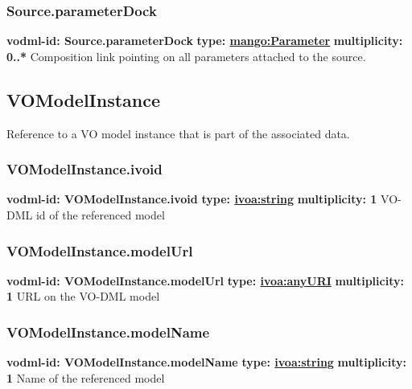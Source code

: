     \subsubsection{Source.parameterDock}
      \textbf{vodml-id: Source.parameterDock} \newline
      \textbf{type: \hyperref[sect:Parameter]{mango:Parameter}} \newline
      \textbf{multiplicity: 0..*} \newline 
      Composition link pointing on all parameters attached to the source.

  \subsection{VOModelInstance}
  \label{sect:VOModelInstance}
    Reference to a VO model instance that is part of the associated data.

    \subsubsection{VOModelInstance.ivoid}
      \textbf{vodml-id: VOModelInstance.ivoid} \newline
      \textbf{type: \hyperref[sect:ivoa]{ivoa:string}} \newline
      \textbf{multiplicity: 1} \newline 
      VO-DML id of the referenced model

    \subsubsection{VOModelInstance.modelUrl}
      \textbf{vodml-id: VOModelInstance.modelUrl} \newline
      \textbf{type: \hyperref[sect:ivoa]{ivoa:anyURI}} \newline
      \textbf{multiplicity: 1} \newline 
      URL on the VO-DML model

    \subsubsection{VOModelInstance.modelName}
      \textbf{vodml-id: VOModelInstance.modelName} \newline
      \textbf{type: \hyperref[sect:ivoa]{ivoa:string}} \newline
      \textbf{multiplicity: 1} \newline 
      Name of the referenced model

